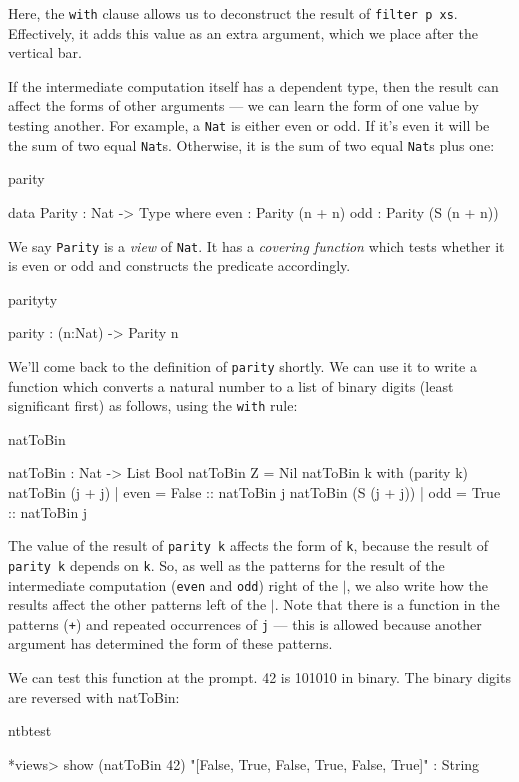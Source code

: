 \noindent
Here, the \texttt{with} clause allows us to deconstruct the result of 
\texttt{filter p xs}.
Effectively, it adds this value as an extra argument, which we place after the
vertical bar.

If the intermediate computation itself has a dependent type, then the result
can affect the forms of other arguments --- we can learn the form of one value by
testing another. For example, a \texttt{Nat} is either even or odd. If it's even it will
be the sum of two equal \texttt{Nat}s. Otherwise, it is the sum of two equal \texttt{Nat}s 
plus one:

\begin{SaveVerbatim}{parity}

data Parity : Nat -> Type where
   even : Parity (n + n)
   odd  : Parity (S (n + n))

\end{SaveVerbatim}

\noindent
We say \texttt{Parity} is a \emph{view} of \texttt{Nat}. 
It has a \emph{covering function} which tests whether
it is even or odd and constructs the predicate accordingly.

\begin{SaveVerbatim}{parityty}

parity : (n:Nat) -> Parity n

\end{SaveVerbatim}

\noindent
We'll come back to the definition of \texttt{parity} shortly. We can use it
to write a function which converts a natural number to a list of binary digits
(least significant first) as follows, using the \texttt{with} rule:

\begin{SaveVerbatim}{natToBin}

natToBin : Nat -> List Bool
natToBin Z = Nil
natToBin k with (parity k)
   natToBin (j + j)     | even = False :: natToBin j
   natToBin (S (j + j)) | odd  = True  :: natToBin j

\end{SaveVerbatim}

\noindent
The value of the result of \texttt{parity k} affects the form of \texttt{k}, 
because the result
of \texttt{parity k} depends on \texttt{k}. 
So, as well as the patterns for the result of the
intermediate computation (\texttt{even} and \texttt{odd}) right of the 
\texttt{$\mid$}, we also write how
the results affect the other patterns left of the $\mid$. Note that there is a
function in the patterns (\texttt{+}) and repeated occurrences of \texttt{j} --- 
this is allowed
because another argument has determined the form of these patterns.

We can test this function at the prompt. 42 is 101010 in binary. The binary digits
are reversed with natToBin:

\begin{SaveVerbatim}{ntbtest}

*views> show (natToBin 42)
"[False, True, False, True, False, True]" : String

\end{SaveVerbatim}



